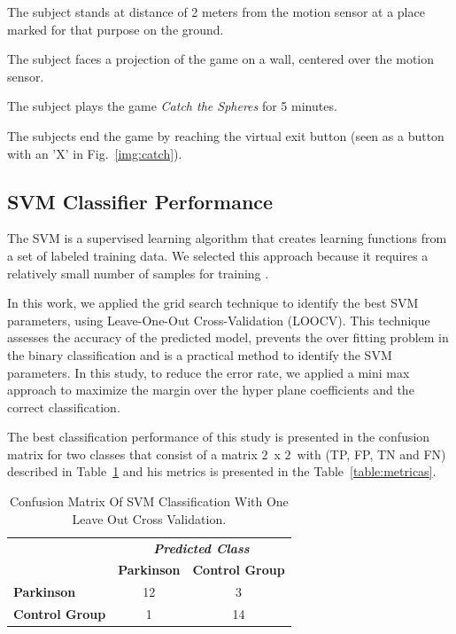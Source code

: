 \documentclass[10pt, conference, compsocconf]{IEEEtran}
\begin{document}
\begin{compactenum}
	\item The subject stands at distance of 2 meters from the motion sensor at a place marked for that purpose on the ground.
	\item The subject faces a projection of the game on a wall, centered over the motion sensor.
	\item The subject plays the game \textit{Catch the Spheres} for 5 minutes.
	\item The subjects end the game by reaching the virtual exit button (seen as a button with an 'X' in Fig.~\ref{img:catch}).
\end{compactenum} 

\subsection{SVM Classifier Performance}
\label{classifier_performance}

The SVM is a supervised learning algorithm that creates learning functions from a set of labeled training data. We selected this approach because it requires a relatively small number of samples for training \cite{kantardzic2011data}. %

In this work, we applied the grid search technique \cite{kantardzic2011data} to identify the best SVM parameters, using Leave-One-Out Cross-Validation (LOOCV). This technique assesses the accuracy of the predicted model, prevents the over fitting problem in the binary classification and is a practical method to identify the SVM parameters. In this study, to reduce the error rate, we applied a mini max approach to maximize the margin over the hyper plane coefficients and the correct classification.


The best classification performance of this study is presented in the confusion matrix \cite{kantardzic2011data} for two classes that consist of a matrix $2$\ x $2$\, with (TP, FP, TN and FN) described in Table~\ref{table:resultadomatrizconfusaosvm} and his metrics is presented in the Table~\ref{table:metricas}.

\begin{table}[!htbp]
\caption{Confusion Matrix Of SVM Classification With One Leave Out Cross Validation.}
\label{table:resultadomatrizconfusaosvm}
\centering
\begin{tabular}{l|c|c|}
\cline{2-3}
\multicolumn{1}{c}{}                         & \multicolumn{2}{|c|}{\textit{\textbf{Predicted Class}}} \\ \cline{2-3} 
                                             & \textbf{Parkinson}      & \textbf{Control Group}         \\ \hline
\multicolumn{1}{|l|}{\textbf{Parkinson}} & 12       & 3          \\ \hline
\multicolumn{1}{|l|}{\textbf{Control Group}}     & 1           & 14     \\ \hline
\end{tabular}
\end{table}
\end{document}

